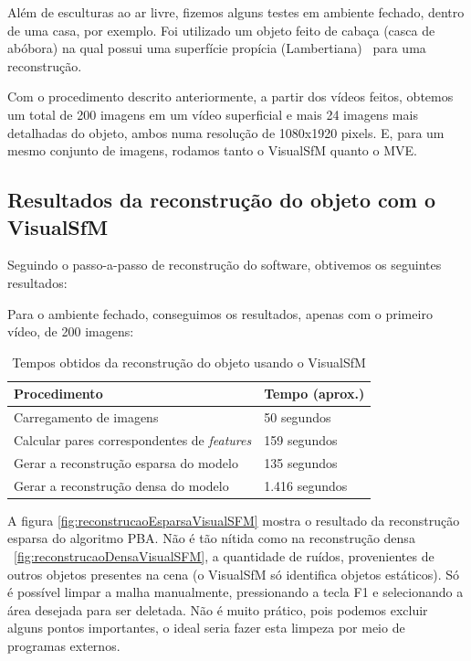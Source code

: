 Além de esculturas ao ar livre, fizemos alguns testes em ambiente fechado, dentro de uma casa, por exemplo. Foi utilizado um objeto feito de cabaça (casca de abóbora) na qual possui uma superfície propícia (Lambertiana)~\cite{basri2003lambertian} para uma reconstrução.

Com o procedimento descrito anteriormente, a partir dos vídeos feitos, obtemos um total de 200 imagens em um vídeo superficial e mais 24 imagens mais detalhadas do objeto, ambos numa resolução de 1080x1920 pixels. E, para um mesmo conjunto de imagens, rodamos tanto o VisualSfM quanto o MVE.

\subsection{Resultados da reconstrução do objeto com o VisualSfM}

Seguindo o passo-a-passo de reconstrução do software, obtivemos os seguintes resultados:




Para o ambiente fechado, conseguimos os resultados, apenas com o primeiro vídeo, de 200 imagens:

\begin{table}[h!]
\caption{Tempos obtidos da reconstrução do objeto usando o VisualSfM}
\label{tab:temposSfM}
\begin{tabular}{|l|p{4.7cm}|}
\hline
Procedimento & Tempo (aprox.) \\ \hline
Carregamento de imagens & 50 segundos \\ \hline
Calcular pares correspondentes de \emph{features} & 159 segundos \\ \hline
Gerar a reconstrução esparsa do modelo & 135 segundos \\ \hline
Gerar a reconstrução densa do modelo & 1.416 segundos \\ \hline
\end{tabular}
\end{table}

A figura \ref{fig:reconstrucaoEsparsaVisualSFM} mostra o resultado da reconstrução esparsa do algoritmo PBA. Não é tão nítida como na reconstrução densa ~\ref{fig:reconstrucaoDensaVisualSFM}, a quantidade de ruídos, provenientes de outros objetos presentes na cena (o VisualSfM só identifica objetos estáticos). Só é possível limpar a malha manualmente, pressionando a tecla F1 e selecionando a área desejada para ser deletada. Não é muito prático, pois podemos excluir alguns pontos importantes, o ideal seria fazer esta limpeza por meio de programas externos.

